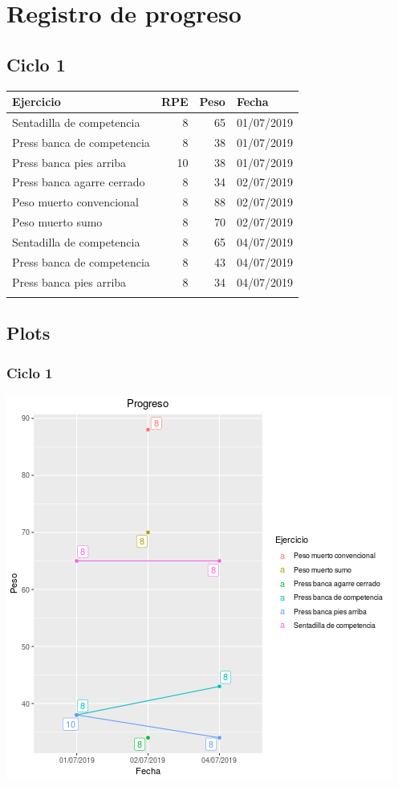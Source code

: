 \documentclass[11pt]{article}
\begin{document}
\section{Registro de progreso}
\label{sec:org3bb6f42}
\subsection{Ciclo 1}
\label{sec:orge872ca2}
\begin{center}
\label{tab:org03c8200}
\begin{tabular}{lrrl}
Ejercicio & RPE & Peso & Fecha\\
\hline
Sentadilla de competencia & 8 & 65 & 01/07/2019\\
Press banca de competencia & 8 & 38 & 01/07/2019\\
Press banca pies arriba & 10 & 38 & 01/07/2019\\
Press banca agarre cerrado & 8 & 34 & 02/07/2019\\
Peso muerto convencional & 8 & 88 & 02/07/2019\\
Peso muerto sumo & 8 & 70 & 02/07/2019\\
Sentadilla de competencia & 8 & 65 & 04/07/2019\\
Press banca de competencia & 8 & 43 & 04/07/2019\\
Press banca pies arriba & 8 & 34 & 04/07/2019\\
 &  &  & \\
\end{tabular}
\end{center}
\subsection{Plots}
\label{sec:org408ba8b}
\subsubsection{Ciclo 1}
\label{sec:orgf6a1ae8}
\begin{center}
\includegraphics[width=.9\linewidth]{tmp.png}
\end{center}
\end{document}
